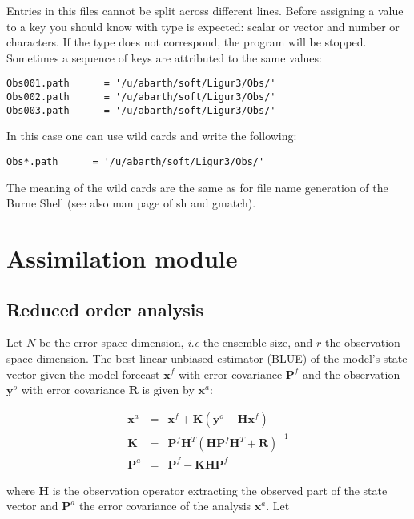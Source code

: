 \documentclass[a4paper,12pt]{article}
\begin{document}
Entries in this files cannot be split across different lines. Before
assigning a value to a key you should know with type is expected:
scalar or vector and number or characters. If the type does not
correspond, the program will be stopped. \\

Sometimes a sequence of keys are attributed to the same values:

\begin{verbatim}
Obs001.path      = '/u/abarth/soft/Ligur3/Obs/' 
Obs002.path      = '/u/abarth/soft/Ligur3/Obs/' 
Obs003.path      = '/u/abarth/soft/Ligur3/Obs/' 
\end{verbatim} 

In this case one can use wild cards and write the following:

\begin{verbatim}
Obs*.path      = '/u/abarth/soft/Ligur3/Obs/' 
\end{verbatim} 

The meaning of the wild cards are the same as for file name generation of the
Burne Shell (see also man page of sh and gmatch).  

\section{Assimilation module}

\subsection{Reduced order analysis}

Let $N$ be the error space dimension, \emph{i.e} the ensemble size, and $r$ the observation space dimension. The best linear unbiased estimator (BLUE) of the model's state vector
given the model forecast $\mathbf x^f$ with error covariance $\mathbf
P^f$ and the observation $\mathbf y^o$ with error covariance $\mathbf
R$ is given by $\mathbf x^a$:

\begin{eqnarray}
\mathbf x^a &=& \mathbf x^f + \mathbf K 
\left(\mathbf y^o - \mathbf H \mathbf x^f \right) \\
\mathbf{K} &=& \mathbf P^f \mathbf H^T 
\left( \mathbf H \mathbf P^f \mathbf H^T + \mathbf R \right)^{-1} 
\label{KPf} \\
\mathbf P^a &=&
\mathbf P^f - \mathbf K \mathbf H \mathbf P^f \label{PaPf}
\end{eqnarray}

where $\mathbf H$ is the observation operator extracting the observed
part of the state vector and $\mathbf P^a$ the error covariance of the
analysis $\mathbf x^a$. Let
\end{document}
